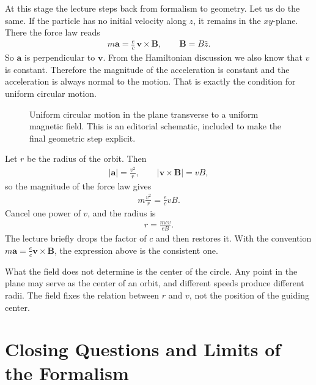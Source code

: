 At this stage the lecture steps back from formalism to geometry. Let us do the same. If the particle has no initial velocity along \(z\), it remains in the \(xy\)-plane. There the force law reads
\begin{align}
m\mathbf a=\frac{e}{c}\,\mathbf v\times\mathbf B,
\qquad
\mathbf B=B\hat z.
\end{align}
So \(\mathbf a\) is perpendicular to \(\mathbf v\). From the Hamiltonian discussion we also know that \(v\) is constant. Therefore the magnitude of the acceleration is constant and the acceleration is always normal to the motion. That is exactly the condition for uniform circular motion.

\begin{figure}[htbp]
\centering
{}
\caption{Uniform circular motion in the plane transverse to a uniform magnetic field. This is an editorial schematic, included to make the final geometric step explicit.}
\end{figure}

Let \(r\) be the radius of the orbit. Then
\begin{align}
|\mathbf a|=\frac{v^2}{r},
\qquad
|\mathbf v\times\mathbf B|=vB,
\end{align}
so the magnitude of the force law gives
\begin{align}
m\frac{v^2}{r}=\frac{e}{c}vB.
\end{align}
Cancel one power of \(v\), and the radius is
\begin{align}
r=\frac{mcv}{eB}.
\end{align}
The lecture briefly drops the factor of \(c\) and then restores it. With the convention \(m\mathbf a=\frac{e}{c}\mathbf v\times\mathbf B\), the expression above is the consistent one.

What the field does not determine is the center of the circle. Any point in the plane may serve as the center of an orbit, and different speeds produce different radii. The field fixes the relation between \(r\) and \(v\), not the position of the guiding center.

\section{Closing Questions and Limits of the Formalism}

